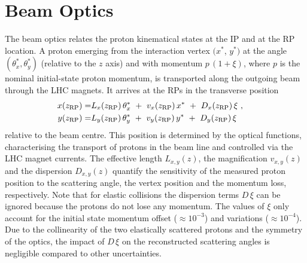 \section{Beam Optics}
\label{sec:beam optics}

The beam optics relates the proton kinematical states at the IP and at the RP location. A proton emerging from the interaction vertex $(x^*$, $y^*)$ at the angle $(\theta_x^*,\theta_y^*)$ (relative to the $z$ axis) and with momentum $p\,(1+\xi)$, where $p$ is the nominal initial-state proton momentum, is transported along the outgoing beam through the LHC magnets. It arrives at the RPs in the transverse position
\begin{equation}
\label{eq:prot trans}
	\begin{aligned}
		x(z_{\rm RP}) =& L_x(z_{\rm RP})\, \theta_x^*\ +\ v_x(z_{\rm RP})\, x^*\ +\ D_x(z_{\rm RP})\, \xi\ ,\cr
		y(z_{\rm RP}) =& L_y(z_{\rm RP})\, \theta_y^*\ +\ v_y(z_{\rm RP})\, y^*\ +\ D_y(z_{\rm RP})\, \xi \quad
	\end{aligned}
\end{equation}
relative to the beam centre. This position is determined by the optical functions, characterising the transport of protons in the beam line and controlled via the LHC magnet currents.
The effective length $L_{x,y}(z)$, the magnification $v_{x,y}(z)$ and the dispersion $D_{x,y}(z)$ quantify the sensitivity of the measured proton position to the scattering angle, the vertex position and the momentum loss, respectively. Note that for elastic collisions the dispersion terms $D\,\xi$ can be ignored because the protons do not lose any momentum. The values of $\xi$ only account for the initial state momentum offset ($\approx 10^{-3}$) and variations ($\approx 10^{-4}$). Due to the collinearity of the two elastically scattered protons and the symmetry of the optics, the impact of $D\,\xi$ on the reconstructed scattering angles is negligible compared to other uncertainties.


